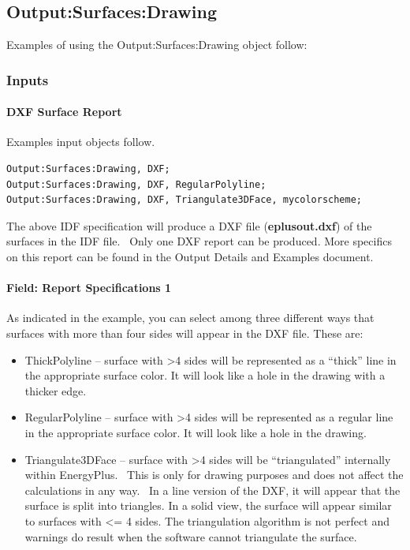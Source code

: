 \subsection{Output:Surfaces:Drawing}\label{outputsurfacesdrawing}

Examples of using the Output:Surfaces:Drawing object follow:

\subsubsection{Inputs}\label{inputs-1-037}

\paragraph{DXF Surface Report}\label{dxf-surface-report}

Examples input objects follow.

\begin{lstlisting}
Output:Surfaces:Drawing, DXF;
Output:Surfaces:Drawing, DXF, RegularPolyline;
Output:Surfaces:Drawing, DXF, Triangulate3DFace, mycolorscheme;
\end{lstlisting}

The above IDF specification will produce a DXF file (\textbf{eplusout.dxf}) of the surfaces in the IDF file.~ Only one DXF report can be produced. More specifics on this report can be found in the Output Details and Examples document.

\paragraph{Field: Report Specifications 1}\label{field-report-specifications-1}

As indicated in the example, you can select among three different ways that surfaces with more than four sides will appear in the DXF file. These are:

\begin{itemize}
\item
  ThickPolyline -- surface with \textgreater{}4 sides will be represented as a ``thick'' line in the appropriate surface color. It will look like a hole in the drawing with a thicker edge.
\item
  RegularPolyline -- surface with \textgreater{}4 sides will be represented as a regular line in the appropriate surface color. It will look like a hole in the drawing.
\item
  Triangulate3DFace -- surface with \textgreater{}4 sides will be ``triangulated'' internally within EnergyPlus.~ This is only for drawing purposes and does not affect the calculations in any way.~ In a line version of the DXF, it will appear that the surface is split into triangles. In a solid view, the surface will appear similar to surfaces with \textless{}= 4 sides. The triangulation algorithm is not perfect and warnings do result when the software cannot triangulate the surface.
\end{itemize}

